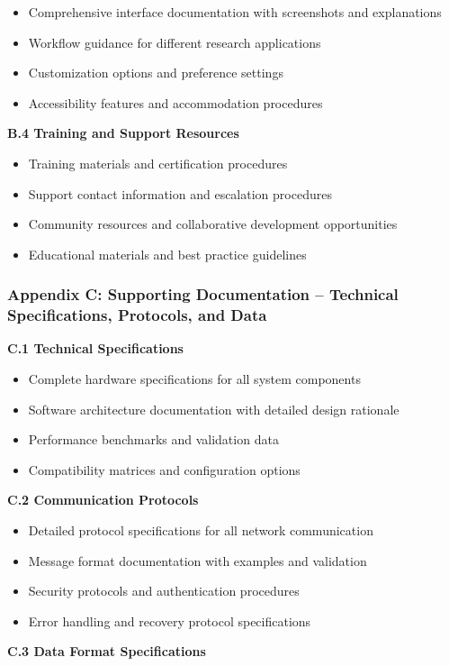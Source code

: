 \documentclass[12pt,a4paper]{report}
\begin{document}
\begin{itemize}
\item Comprehensive interface documentation with screenshots and explanations
\item Workflow guidance for different research applications
\item Customization options and preference settings
\item Accessibility features and accommodation procedures

\end{itemize}
\textbf{B.4 Training and Support Resources}

\begin{itemize}
\item Training materials and certification procedures
\item Support contact information and escalation procedures
\item Community resources and collaborative development opportunities
\item Educational materials and best practice guidelines

\end{itemize}
\subsubsection{Appendix C: Supporting Documentation – Technical Specifications, Protocols, and Data}

\textbf{C.1 Technical Specifications}

\begin{itemize}
\item Complete hardware specifications for all system components
\item Software architecture documentation with detailed design rationale
\item Performance benchmarks and validation data
\item Compatibility matrices and configuration options

\end{itemize}
\textbf{C.2 Communication Protocols}

\begin{itemize}
\item Detailed protocol specifications for all network communication
\item Message format documentation with examples and validation
\item Security protocols and authentication procedures
\item Error handling and recovery protocol specifications

\end{itemize}
\textbf{C.3 Data Format Specifications}
\end{document}
